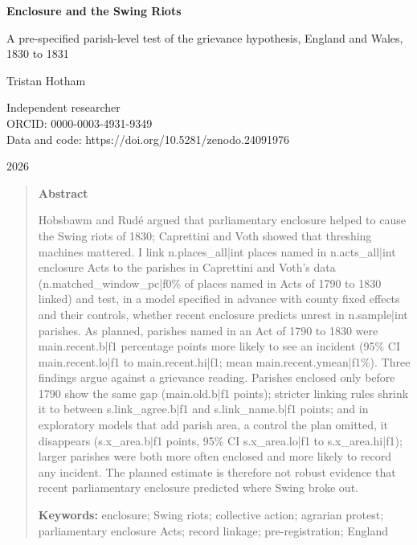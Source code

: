\documentclass[11pt,a4paper]{article}
\begin{document}
\begin{center}
{\LARGE\bfseries Enclosure and the Swing Riots\par}
\vspace{0.4em}
{\large A pre-specified parish-level test of the grievance hypothesis, England and Wales, 1830 to 1831\par}
\vspace{1.2em}
{\large Tristan Hotham\par}
\vspace{0.3em}
{\small Independent researcher\\ ORCID: 0000-0003-4931-9349\\ Data and code: https://doi.org/10.5281/zenodo.24091976\par}
\vspace{0.8em}
2026
\end{center}

\begin{quote}\small
\begin{center}\textbf{Abstract}\end{center}
Hobsbawm and Rud\'e argued that parliamentary enclosure helped to cause the Swing riots of 1830; Caprettini and Voth showed that threshing machines mattered. I link {{n.places_all|int}} places named in {{n.acts_all|int}} enclosure Acts to the parishes in Caprettini and Voth's data ({{n.matched_window_pc|f0}}\% of places named in Acts of 1790 to 1830 linked) and test, in a model specified in advance with county fixed effects and their controls, whether recent enclosure predicts unrest in {{n.sample|int}} parishes. As planned, parishes named in an Act of 1790 to 1830 were {{main.recent.b|f1}} percentage points more likely to see an incident (95\% CI {{main.recent.lo|f1}} to {{main.recent.hi|f1}}; mean {{main.recent.ymean|f1}}\%). Three findings argue against a grievance reading. Parishes enclosed only before 1790 show the same gap ({{main.old.b|f1}} points); stricter linking rules shrink it to between {{s.link_agree.b|f1}} and {{s.link_name.b|f1}} points; and in exploratory models that add parish area, a control the plan omitted, it disappears ({{s.x_area.b|f1}} points, 95\% CI {{s.x_area.lo|f1}} to {{s.x_area.hi|f1}}); larger parishes were both more often enclosed and more likely to record any incident. The planned estimate is therefore not robust evidence that recent parliamentary enclosure predicted where Swing broke out.

\textbf{Keywords:} enclosure; Swing riots; collective action; agrarian protest; parliamentary enclosure Acts; record linkage; pre-registration; England
\end{quote}
\end{document}
